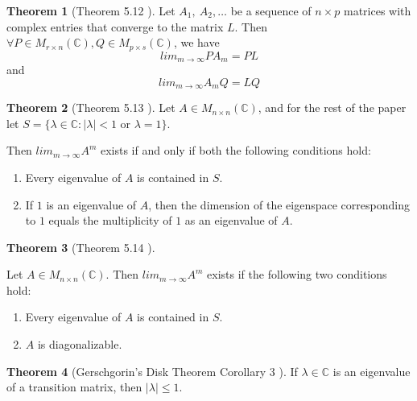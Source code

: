 \documentclass{amsart}
\theoremstyle{definition}
\newtheorem{theorem}{Theorem}
\theoremstyle{remark}
\numberwithin{equation}{section}
\begin{document}
\begin{theorem}[Theorem 5.12 \cite{friedberg2003linear}]\label{theorem512}
Let $A_1,\ A_2, \ldots$ be a sequence of $n \times p$ matrices with
complex entries that converge to the matrix $L$. Then $\forall P \in
M_{r \times n}(\mathbb{C}), Q \in M_{p \times s}(\mathbb{C})$, we
have
$$lim_{m \to \infty} PA_m = PL$$
and
$$ lim_{m \to \infty} A_mQ = LQ $$

\end{theorem}


\begin{theorem}[Theorem 5.13 \cite{friedberg2003linear}]\label{theorem513}
Let $A \in M_{n \times n}(\mathbb{C})$, and for the rest of the
paper let $S = \{ \lambda \in \mathbb{C}: |\lambda| < 1$ or $\lambda
= 1\}$.

Then $lim_{m \to \infty}A^m$ exists if and only if both the following conditions hold:

\begin{enumerate}
    \item Every eigenvalue of $A$ is contained in $S$.
    \item If $1$ is an eigenvalue of $A$, then the dimension of the eigenspace corresponding to $1$ equals the multiplicity of $1$ as an eigenvalue of $A$.

\end{enumerate}

\end{theorem}

\begin{theorem}[Theorem 5.14 \cite{friedberg2003linear}]\label{theorem514}

Let $A \in M_{n \times n}(\mathbb{C})$.
Then $lim_{m \to \infty}A^m$ exists if the following two conditions hold:

\begin{enumerate}
    \item Every eigenvalue of $A$ is contained in $S$.
    \item $A$ is diagonalizable.

\end{enumerate}

\end{theorem}


\begin{theorem}[Gerschgorin's Disk Theorem Corollary 3 \cite{friedberg2003linear}]\label{theorem516}
If $\lambda \in \mathbb{C}$ is an eigenvalue of a transition matrix,
then $|\lambda| \leq 1$.

\end{theorem}
\end{document}
